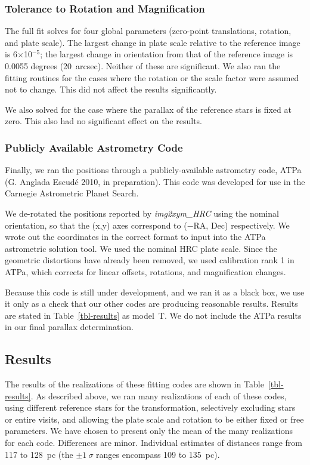 \documentclass[12pt,preprint]{aastex}
\begin{document}
\subsubsection{Tolerance to Rotation and Magnification}

The full fit solves for four global parameters
(zero-point translations, rotation, and plate scale).
The largest change in plate scale relative to the reference image is 
6$\times$10$^{-5}$; the largest change in orientation from that of the
reference image is 0.0055 degrees (20~arcsec). Neither of these are significant.
We also ran the fitting routines for the cases where the rotation or the 
scale factor were assumed not to change. This did not affect the results
significantly.

We also solved for the case where the parallax of the reference stars is
fixed at zero. This also had no significant effect on the results.

\subsubsection{Publicly Available Astrometry Code}

Finally, we ran the positions through a publicly-available astrometry 
code, ATPa (G. Anglada Escud\'e 2010, in preparation).
This code was developed for use in the Carnegie Astrometric Planet Search. 

We de-rotated the positions reported by {\it img2xym\_HRC} using the 
nominal orientation, so that the (x,y) axes correspond to ($-$RA, Dec)
respectively. We wrote out the coordinates in the correct format to
input into the ATPa astrometric solution tool. 
We used the nominal HRC plate scale. Since the geometric distortions
have already been removed, we used calibration rank 1 in ATPa, which
corrects for linear offsets, rotations, and magnification changes.

Because this code is still under development, and we ran it as a black box,
we use it only as a check that our other codes are producing reasonable 
results. Results are stated in Table~\ref{tbl-results} as model~T.
We do not include the ATPa results in our final parallax determination.


\subsection{Results}

The results of the realizations of these fitting codes are shown in
Table~\ref{tbl-results}. As described above, we ran many realizations
of each of these codes, using different reference stars for the transformation,
selectively excluding stars or entire visits, and allowing the plate scale and
rotation to be either fixed or free parameters.
We have chosen to present only the mean of the many realizations for each code.
Differences are minor. Individual estimates of distances range from 117 to
128~pc (the $\pm 1~\sigma$ ranges encompass 109 to 135~pc).
\end{document}
